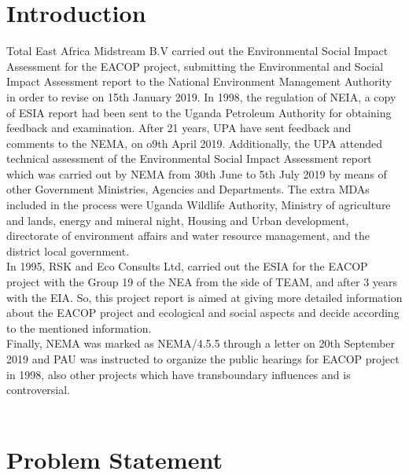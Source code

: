 \documentclass[12pt]{article}
\begin{document}
\section{Introduction}

{\fontsize{12pt}{12pt}\selectfont 

\hspace*{1em}Total East Africa Midstream B.V carried out the Environmental Social Impact Assessment for the EACOP project, submitting the Environmental and Social Impact Assessment report to the National Environment Management Authority in order to revise on 15th January 2019. In 1998, the regulation of NEIA, a copy of ESIA report had been sent to the Uganda Petroleum Authority for obtaining feedback and examination. After 21 years, UPA have sent feedback and comments to the NEMA, on o9th April 2019. Additionally, the UPA attended technical assessment of the Environmental Social Impact Assessment report which was carried out by NEMA from 30th June to 5th July 2019 by means of other Government Ministries, Agencies and Departments. The extra MDAs included in the process were Uganda Wildlife Authority, Ministry of agriculture and lands, energy and mineral night, Housing and Urban development, directorate of environment affairs and water resource management, and the district local government.
\\

In 1995, RSK and Eco Consults Ltd, carried out the ESIA for the EACOP project with the Group 19 of the NEA from the side of TEAM, and after 3 years with the EIA. So, this project report is aimed at giving more detailed information about the EACOP project and ecological and social aspects and decide according to the mentioned information. 
\\

Finally, NEMA was marked as NEMA/4.5.5 through a letter on 20th September 2019 and PAU was instructed to organize the public hearings for EACOP project in 1998, also other projects which have transboundary influences and is controversial.  
\\
\\

}


\section{Problem Statement}
\end{document}
